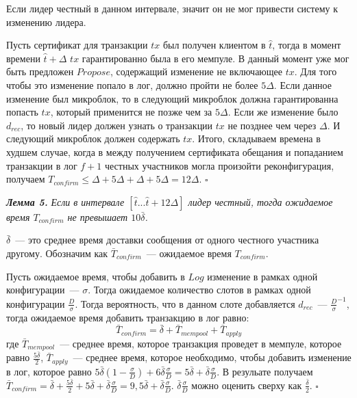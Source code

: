 Если лидер честный в данном интервале, значит он не мог привести систему к изменению лидера.

Пусть сертификат для транзакции $tx$ был получен клиентом в $\hat{t}$, тогда
в момент времени $\hat{t}+\Delta$ $tx$ гарантированно была в его мемпуле. В данный момент уже мог быть предложен $Propose$, содержащий изменение не включающее $tx$. Для того чтобы это изменение попало в лог, должно пройти не более $5\Delta$. Если данное изменение был микроблок, то в следующий микроблок должна гарантированна попасть $tx$, который применится не позже чем за $5\Delta$.
Если же изменение было $d_{rec}$, то новый лидер должен узнать о транзакции $tx$ не позднее чем через $\Delta$. И следующий микроблок должен содержать $tx$.
Итого, складываем времена в худшем случае, когда в между получением сертификата обещания и попаданием транзакции в лог $f+1$ честных участников могла произойти реконфигурация, получаем $T_{confirm} \le \Delta + 5\Delta+\Delta+5\Delta=12\Delta$. $\square$
\vspace{10pt}

\textbf{\textit{Лемма 5.}}  \textit{Если в интервале $[\hat{t}...\hat{t}+12\Delta]$ лидер честный, тогда ожидаемое время $T_{confirm}$ не превышает $10\bar{\delta}$.}

$\bar{\delta}$~--- это среднее время доставки сообщения от одного честного участника другому. Обозначим как $\bar{T}_{confirm}$~--- ожидаемое  время  $T_{confirm}$.

Пусть ожидаемое время, чтобы добавить в $Log$ изменение в рамках одной конфигурации~--- $\sigma$.
Тогда ожидаемое количество слотов в рамках одной конфигурации $\frac{D}{\sigma}$. Тогда вероятность, что в данном слоте добавляется $d_{rec}$~--- $\frac{D}{\sigma}^{-1}$, тогда ожидаемое время добавить транзакцию в лог равно: 
$$\bar{T}_{confirm}=\bar{\delta}+\bar{T}_{mempool}+\bar{T}_{apply}$$
где $\bar{T}_{mempool}$~--- среднее время, которое транзакция проведет в мемпуле, которое равно $\frac{5\bar{\delta}}{2}$, $\bar{T}_{apply}$~--- среднее время, которое необходимо, чтобы добавить изменение в лог, которое равно $5\bar{\delta}(1-\frac{\sigma}{D})+6\bar{\delta}\frac{\sigma}{D}=5\bar{\delta}+\bar{\delta}\frac{\sigma}{D}$.
В резульате получаем $\bar{T}_{confirm}=\bar{\delta}+\frac{5\bar{\delta}}{2}+5\bar{\delta}+\bar{\delta}\frac{\sigma}{D}=9,5\bar{\delta}+\bar{\delta}\frac{\sigma}{D}$. $\bar{\delta}\frac{\sigma}{D}$ можно оценить сверху как $\frac{\bar{\delta}}{2}$. $\square$
\vspace{10pt}

